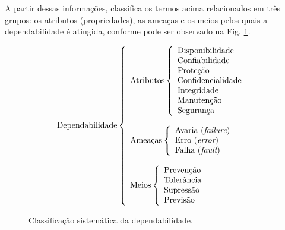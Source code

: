A partir dessas informações,  classifica os termos
acima relacionados em três grupos: os atributos (propriedades), as ameaças e os
meios pelos quais a dependabilidade é atingida, conforme pode ser observado
na Fig. \ref{fig:div_avizienis}.

\begin{figure}[htb]
\centering
\footnotesize
\[
\text{Dependabilidade}
\left\{
\begin{array}{l}
\text{Atributos}
    \left\{
    \begin{array}{l}
        \text{Disponibilidade}\\
        \text{Confiabilidade}\\
        \text{Proteção}\\
        \text{Confidencialidade}\\
        \text{Integridade}\\
        \text{Manutenção}\\
        \text{Segurança}
    \end{array}
    \right.
\\
\\
\text{Ameaças}
    \left\{
    \begin{array}{l}
        \text{Avaria ({\it failure})}\\
        \text{Erro ({\it error})}\\
        \text{Falha ({\it fault})}
    \end{array}
    \right.
\\
\\
\text{Meios}
    \left\{
    \begin{array}{l}
        \text{Prevenção}\\
        \text{Tolerância}\\
        \text{Supressão}\\
        \text{Previsão}
    \end{array}
    \right.
\end{array}
\right.
\]
\caption{Classificação sistemática da dependabilidade.}
\label{fig:div_avizienis}
\end{figure}

